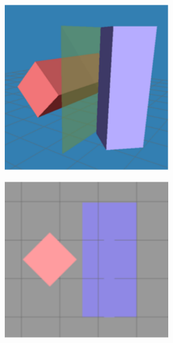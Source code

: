\documentclass[a4paper]{article}
\begin{document}
\begin{figure}[h]
  \centering

  \begin{subfigure}[b]{0.3\textwidth}
    \centering
    \includegraphics[width=0.8\textwidth]{graphics/colldet_sat_3d_1.eps}
  \end{subfigure}
  \begin{subfigure}[b]{0.3\textwidth}
    \centering
    \includegraphics[width=0.8\textwidth]{graphics/colldet_sat_3d_2.eps}
  \end{subfigure}

  \vspace{1em}


\end{figure}
\end{document}
